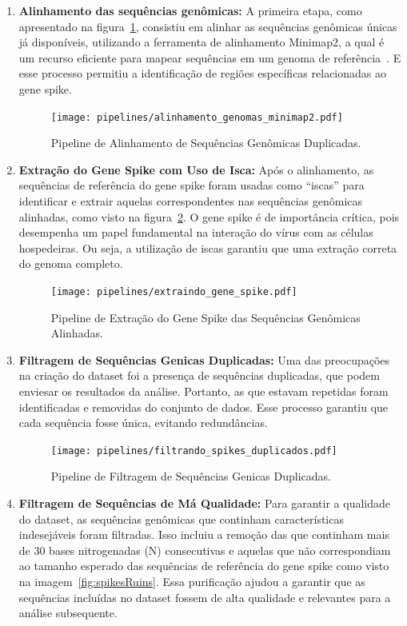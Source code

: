 \begin{enumerate}
  \item \textbf{Alinhamento das sequências genômicas:} A primeira etapa, como apresentado na figura~\ref{fig:alinhamentoGenomas}, consistiu em alinhar as sequências genômicas únicas já disponíveis, utilizando a ferramenta de alinhamento Minimap2, a qual é um recurso eficiente para mapear sequências em um genoma de referência~\cite{minimap2_li_2018}. E esse processo permitiu a identificação de regiões específicas relacionadas ao gene spike.
        \begin{figure}[htb]
          \centering
          \caption{Pipeline de Alinhamento de Sequências Genômicas Duplicadas.}
          \texttt{[image: pipelines/alinhamento\_genomas\_minimap2.pdf]}
          ~\label{fig:alinhamentoGenomas}
        \end{figure}
  \item \textbf{Extração do Gene Spike com Uso de Isca:} Após o alinhamento, as sequências de referência do gene spike foram usadas como ``iscas'' para identificar e extrair aquelas correspondentes nas sequências genômicas alinhadas, como visto na figura~\ref{fig:extracaoSpike}. O gene spike é de importância crítica, pois desempenha um papel fundamental na interação do vírus com as células hospedeiras. Ou seja, a utilização de iscas garantiu que uma extração correta do genoma completo.
        \begin{figure}[htb]
          \centering
          \caption{Pipeline de Extração do Gene Spike das Sequências Genômicas Alinhadas.}
          \texttt{[image: pipelines/extraindo\_gene\_spike.pdf]}
          ~\label{fig:extracaoSpike}
        \end{figure}
  \item \textbf{Filtragem de Sequências Genicas Duplicadas:} Uma das preocupações na criação do dataset foi a presença de sequências duplicadas, que podem enviesar os resultados da análise. Portanto, as que estavam repetidas foram identificadas e removidas do conjunto de dados. Esse processo garantiu que cada sequência fosse única, evitando redundâncias.
        \begin{figure}[htb]
          \centering
          \caption{Pipeline de Filtragem de Sequências Genicas Duplicadas.}
          \texttt{[image: pipelines/filtrando\_spikes\_duplicados.pdf]}
          ~\label{fig:spikeDuplicados}
        \end{figure}
  \item \textbf{Filtragem de Sequências de Má Qualidade:} Para garantir a qualidade do dataset, as sequências genômicas que continham características indesejáveis foram filtradas. Isso incluiu a remoção das que continham mais de 30 bases nitrogenadas (N) consecutivas e aquelas que não correspondiam ao tamanho esperado das sequências de referência do gene spike como visto na imagem~\ref{fig:spikesRuins}. Essa purificação ajudou a garantir que as sequências incluídas no dataset fossem de alta qualidade e relevantes para a análise subsequente.

\end{enumerate}

